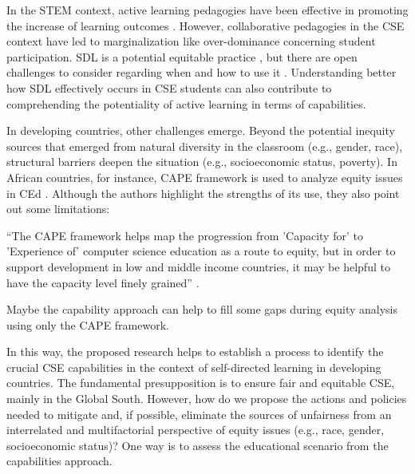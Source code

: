 In the \gls{STEM} context, active learning pedagogies have been effective in promoting the increase of learning outcomes \cite{prince:2004}. However, collaborative pedagogies in the \gls{CSE} context have led to marginalization \cite{lewis:2015} like over-dominance concerning student participation. \acrfull{SDL} is a potential equitable practice \cite{anderson:2022}, but there are open challenges to consider regarding when and how to use it \cite{brookfield:1993}. Understanding better how \gls{SDL} effectively occurs in \gls{CSE} students can also contribute to comprehending the potentiality of active learning in terms of capabilities.

In developing countries, other challenges emerge. Beyond the potential inequity sources that emerged from natural diversity in the classroom (e.g., gender, race), structural barriers deepen the situation (e.g., socioeconomic status, poverty). In African countries, for instance, \gls{CAPE} framework is used to analyze equity issues in \gls{CEd} \cite{tshukudu:2023}. Although the authors highlight the strengths of its use, they also point out some limitations: 
\begin{citacao}
    ``The \gls{CAPE} framework helps map the progression from 'Capacity for' to 'Experience of' computer science education as a route to equity, but in order to support development in low and middle income countries, it may be helpful to have the capacity level finely grained'' \cite[p.~1]{tshukudu:2023}.
\end{citacao}
Maybe the capability approach can help to fill some gaps during equity analysis using only the \gls{CAPE} framework.

 In this way, the proposed research helps to establish a process to identify the crucial \gls{CSE} capabilities in the context of self-directed learning in developing countries. The fundamental presupposition is to ensure fair and equitable \gls{CSE}, mainly in the Global South. However, how do we propose the actions and policies needed to mitigate and, if possible, eliminate the sources of unfairness from an interrelated and multifactorial perspective of equity issues (e.g., race, gender, socioeconomic status)? One way is to assess the educational scenario from the capabilities approach.